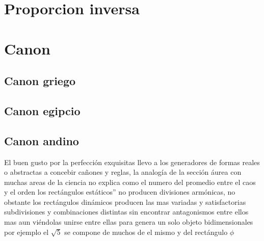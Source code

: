 \documentclass[a4paper]{book}
\begin{document}
\section{Proporcion inversa}
\section{Canon}

\subsection{Canon griego}
\subsection{Canon egipcio}
\subsection{Canon andino}
El buen gusto por la perfección exquisitas llevo a los generadores de formas reales o abstractas a concebir cañones y reglas, la analogía de la sección áurea con muchas areas de la ciencia no explica como el numero del promedio entre el caos y el orden los rectángulos estáticos'' no producen divisiones armónicas, no obstante los rectángulos dinámicos producen las mas variadas y satisfactorias subdivisiones  y combinaciones distintas sin encontrar antagonismos entre ellos mas aun viéndolas unirse entre ellas para genera un solo objeto bidimensionales  por ejemplo el $\sqrt{5}$ se compone de muchos de el mismo y del rectángulo $\phi$




















\printindex
\end{document}
